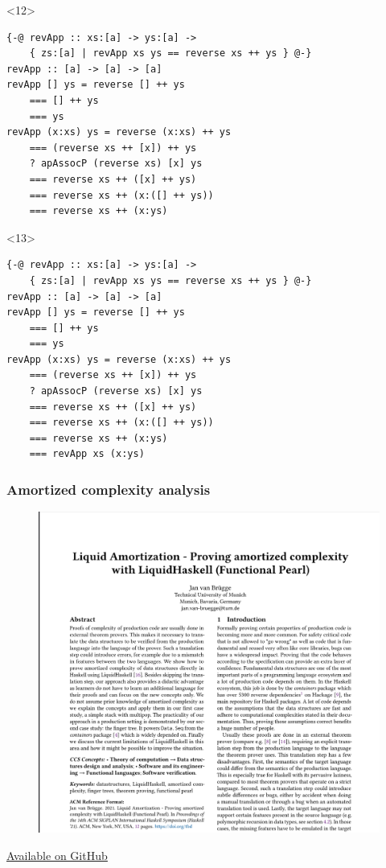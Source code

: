 \documentclass{beamer}
\begin{document}
\begin{frame}[fragile]
\begin{onlyenv}<12>
\begin{verbatim}
{-@ revApp :: xs:[a] -> ys:[a] ->
    { zs:[a] | revApp xs ys == reverse xs ++ ys } @-}
revApp :: [a] -> [a] -> [a]
revApp [] ys = reverse [] ++ ys
    === [] ++ ys
    === ys
revApp (x:xs) ys = reverse (x:xs) ++ ys
    === (reverse xs ++ [x]) ++ ys
    ? apAssocP (reverse xs) [x] ys
    === reverse xs ++ ([x] ++ ys)
    === reverse xs ++ (x:([] ++ ys))
    === reverse xs ++ (x:ys)
\end{verbatim}
\end{onlyenv}

\begin{onlyenv}<13>
\begin{verbatim}
{-@ revApp :: xs:[a] -> ys:[a] ->
    { zs:[a] | revApp xs ys == reverse xs ++ ys } @-}
revApp :: [a] -> [a] -> [a]
revApp [] ys = reverse [] ++ ys
    === [] ++ ys
    === ys
revApp (x:xs) ys = reverse (x:xs) ++ ys
    === (reverse xs ++ [x]) ++ ys
    ? apAssocP (reverse xs) [x] ys
    === reverse xs ++ ([x] ++ ys)
    === reverse xs ++ (x:([] ++ ys))
    === reverse xs ++ (x:ys)
    === revApp xs (x:ys)
\end{verbatim}
\end{onlyenv}

\end{frame}

\begin{frame}[fragile]
\frametitle{Amortized complexity analysis}

\begin{figure}[ht]
\includegraphics[width=0.7\linewidth,height=0.7\textheight,keepaspectratio]{./paper.png}
\end{figure}

\href{https://github.com/jvanbruegge/liquidhaskell-amortized-complexity/releases/download/v1/liquid_amortization.pdf}{\color{blue}\underline{Available on GitHub}}

\end{frame}
\end{document}
